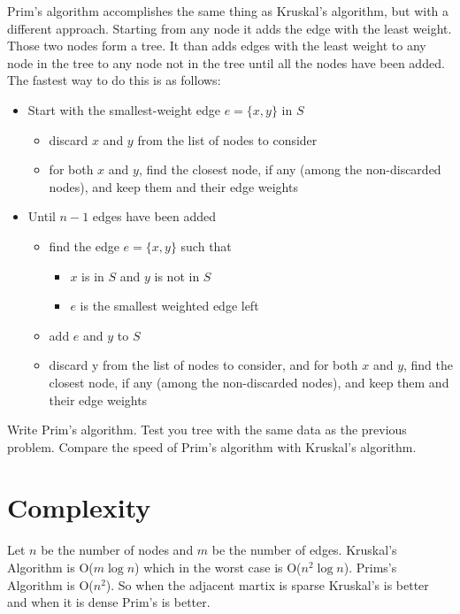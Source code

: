 Prim's algorithm accomplishes the same thing as Kruskal's algorithm, but with a different approach.
Starting from any node it adds the edge with the least weight.
Those two nodes form a tree.
It than adds edges with the least weight to any node in the tree to any node not in the tree until all the nodes have been added.
The fastest way to do this is as follows:
\flushleft
\begin{itemize}
\item Start with the smallest-weight edge $e = \{x, y\}$ in $S$
\begin{itemize}
\item discard $x$ and $y$ from the list of nodes to consider
\item for both $x$ and $y$, find the closest node, if any (among the non-discarded nodes), and keep them and their edge weights
\end{itemize}
\item Until $n-1$ edges have been added
\begin{itemize}
\item find the edge $e = \{x, y\}$ such that
\begin{itemize}
\item $x$ is in $S$ and $y$ is not in $S$
\item $e$ is the smallest weighted edge left
\end{itemize}
\item add $e$ and $y$ to $S$
\item discard y from the list of nodes to consider, and for both $x$ and $y$, find the closest node, if any (among the non-discarded nodes), and keep them and their edge weights
\end{itemize}
\end{itemize}

\begin{problem}
Write Prim's algorithm.
Test you tree with the same data as the previous problem.
Compare the speed of Prim's algorithm with Kruskal's algorithm. 
\end{problem}

\section*{Complexity}
Let $n$ be the number of nodes and $m$ be the number of edges.
Kruskal's Algorithm is O($m\log{n}$) which in the worst case is O($n^2\log{n}$).
Prims's Algorithm is O($n^2$).
So when the adjacent martix is sparse Kruskal's is better and when it is dense Prim's is better. 